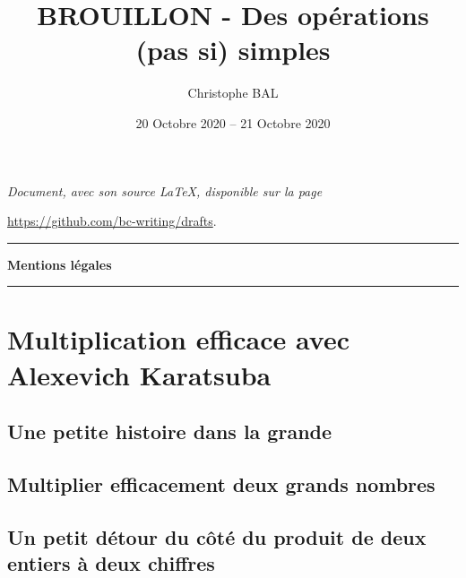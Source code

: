 \documentclass[12pt]{amsart}
\begin{document}
\title{BROUILLON - Des opérations (pas si) simples}
\author{Christophe BAL}
\date{20 Octobre 2020 -- 21 Octobre 2020}

\maketitle

\begin{center}
	\itshape
	Document, avec son source \LaTeX, disponible sur la page
	
	\url{https://github.com/bc-writing/drafts}.
\end{center}


\bigskip


\begin{center}
	\hrule\vspace{.3em}
	{
		\fontsize{1.35em}{1em}\selectfont
		\textbf{Mentions \og légales \fg}
	}
			
	\vspace{0.45em}
	\doclicenseThis
	\hrule
\end{center}


\bigskip
\setcounter{tocdepth}{2}
\tableofcontents




\newpage

\section{Multiplication efficace avec Alexevich Karatsuba}

	\subsection{Une petite histoire dans la grande}
	


	\subsection{Multiplier efficacement deux grands nombres}
	


	\subsection{Un petit détour du côté du produit de deux entiers à deux chiffres}
	
	
	


%	
\end{document}

